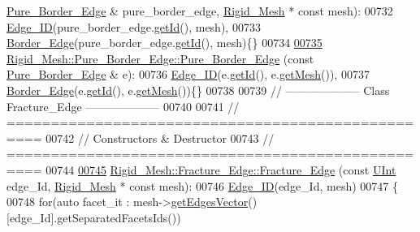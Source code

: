 \begin{DoxyCode}
      \hyperlink{classFVCode3D_1_1Rigid__Mesh_1_1Pure__Border__Edge}{Pure\_Border\_Edge} & pure\_border\_edge, \hyperlink{classFVCode3D_1_1Rigid__Mesh}{Rigid\_Mesh} * \textcolor{keyword}{const} mesh):
00732     \hyperlink{classFVCode3D_1_1Rigid__Mesh_1_1Edge__ID}{Edge\_ID}(pure\_border\_edge.\hyperlink{classFVCode3D_1_1Rigid__Mesh_1_1Edge__ID_af17ee26739dd0bb462a21a90c2c1e633}{getId}(), mesh),
00733     \hyperlink{classFVCode3D_1_1Rigid__Mesh_1_1Border__Edge}{Border\_Edge}(pure\_border\_edge.\hyperlink{classFVCode3D_1_1Rigid__Mesh_1_1Edge__ID_af17ee26739dd0bb462a21a90c2c1e633}{getId}(), mesh)\{\}
00734 
\hypertarget{RigidMesh_8cpp_source.tex_l00735}{}\hyperlink{classFVCode3D_1_1Rigid__Mesh_1_1Pure__Border__Edge_aae95df1938a302a415ba7a0bbd7e83f4}{00735} \hyperlink{classFVCode3D_1_1Rigid__Mesh_1_1Pure__Border__Edge_a2fb097d2d34f9f6291001e9b7f300e37}{Rigid\_Mesh::Pure\_Border\_Edge::Pure\_Border\_Edge} (\textcolor{keyword}{const} 
      \hyperlink{classFVCode3D_1_1Rigid__Mesh_1_1Pure__Border__Edge}{Pure\_Border\_Edge} & e):
00736     \hyperlink{classFVCode3D_1_1Rigid__Mesh_1_1Edge__ID}{Edge\_ID}(e.\hyperlink{classFVCode3D_1_1Rigid__Mesh_1_1Edge__ID_af17ee26739dd0bb462a21a90c2c1e633}{getId}(), e.\hyperlink{classFVCode3D_1_1Rigid__Mesh_1_1Edge__ID_a197a8049cfb5e26c077f668ffb49e6eb}{getMesh}()),
00737     \hyperlink{classFVCode3D_1_1Rigid__Mesh_1_1Border__Edge}{Border\_Edge}(e.\hyperlink{classFVCode3D_1_1Rigid__Mesh_1_1Edge__ID_af17ee26739dd0bb462a21a90c2c1e633}{getId}(), e.\hyperlink{classFVCode3D_1_1Rigid__Mesh_1_1Edge__ID_a197a8049cfb5e26c077f668ffb49e6eb}{getMesh}())\{\}
00738 
00739 \textcolor{comment}{// --------------------   Class Fracture\_Edge   --------------------}
00740 
00741 \textcolor{comment}{// ==================================================}
00742 \textcolor{comment}{// Constructors & Destructor}
00743 \textcolor{comment}{// ==================================================}
00744 
\hypertarget{RigidMesh_8cpp_source.tex_l00745}{}\hyperlink{classFVCode3D_1_1Rigid__Mesh_1_1Fracture__Edge_a9b7b4e922c35eb8e83bc3209b4a668f2}{00745} \hyperlink{classFVCode3D_1_1Rigid__Mesh_1_1Fracture__Edge_a9b7b4e922c35eb8e83bc3209b4a668f2}{Rigid\_Mesh::Fracture\_Edge::Fracture\_Edge} (\textcolor{keyword}{const} 
      \hyperlink{namespaceFVCode3D_a4bf7e328c75d0fd504050d040ebe9eda}{UInt} edge\_Id, \hyperlink{classFVCode3D_1_1Rigid__Mesh}{Rigid\_Mesh} * \textcolor{keyword}{const} mesh):
00746     \hyperlink{classFVCode3D_1_1Rigid__Mesh_1_1Edge__ID}{Edge\_ID}(edge\_Id, mesh)
00747 \{
00748     \textcolor{keywordflow}{for}(\textcolor{keyword}{auto} facet\_it : mesh->\hyperlink{classFVCode3D_1_1Rigid__Mesh_a807a6932cb5b80eb73bf86c3dae06a80}{getEdgesVector}()[edge\_Id].getSeparatedFacetsIds())

\end{DoxyCode}
